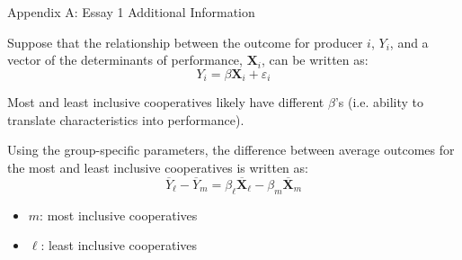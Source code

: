 \documentclass[aspectratio=169]{beamer}
\newenvironment{wideitemize}{\itemize\addtolength{\itemsep}{10pt}}{\enditemize}
\begin{document}
\begin{frame}{Appendix A: Essay 1 Additional Information}
    \begin{wideitemize}
        \item Suppose that the relationship between the outcome for producer $i$, $Y_i$, and a vector of the determinants of performance, $\mathbf{X}_i$, can be written as: \vspace{.25cm}
            \begin{equation} \label{eq:E1_1}
                Y_i = \beta \mathbf{X}_i + \varepsilon_i 
            \end{equation} 
        \item Most and least inclusive cooperatives likely have different $\beta$'s (i.e. ability to translate characteristics into performance). 
        \item Using the group-specific parameters, the difference between average outcomes for the most and least inclusive cooperatives is written as: \vspace{.25cm}
            \begin{equation} \label{eq:E1_2}
                \overline{Y}_{\ell} - \overline{Y}_{m} =  \beta_{\ell}\overline{\mathbf{X}}_{\ell} - \beta_{m}\overline{\mathbf{X}}_{m}
            \end{equation}  
            \begin{itemize}
                \item $m$: most inclusive cooperatives
                \item $\ell$: least inclusive cooperatives 
            \end{itemize}
    \end{wideitemize}
\end{frame}
\end{document}
